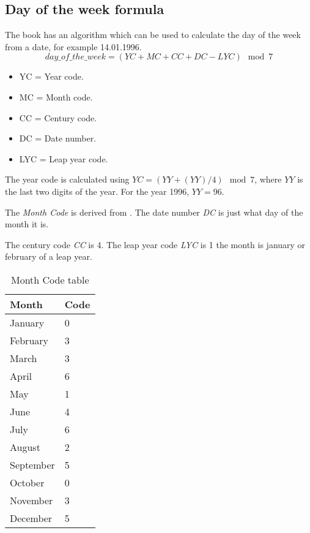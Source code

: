 \subsection{Day of the week formula}
\label{section:BT:day-of-the-week-formula}
The book \cite{Hale-Evans2006} has an algorithm which can be used to calculate
the day of the week from a date, for example 14.01.1996.
\begin{equation}
  day\_of\_the\_week
  = (YC + MC + CC + DC - LYC) \mod{7}
  \label{eq:day_of_the_week}
\end{equation}

\begin{itemize}
  \item YC = Year code.
  \item MC = Month code.
  \item CC = Century code.
  \item DC = Date number.
  \item LYC = Leap year code.
\end{itemize}

The year code is calculated using
$YC = (YY + (YY)/4) \mod{7}$, where $YY$ is the last
two digits of the year. For the year 1996, $YY = 96$.

The \textit{Month Code} is derived from .
The date number \textit{DC} is just what day of the month it is.

The century code \textit{CC} is 4. The leap year code \textit{LYC} is 1 the
month is january or february of a leap year.

\begin{table}[h]
  \centering
  \caption{Month Code table}
  \label{table:month_codes}
  \begin{tabular}{|l|l|}\hline
    Month     & Code \\ \hline
    January   & 0    \\
    February  & 3    \\
    March     & 3    \\
    April     & 6    \\
    May       & 1    \\
    June      & 4    \\
    July      & 6    \\
    August    & 2    \\
    September & 5    \\
    October   & 0    \\
    November  & 3    \\
    December  & 5    \\
    \hline
  \end{tabular}
\end{table}
